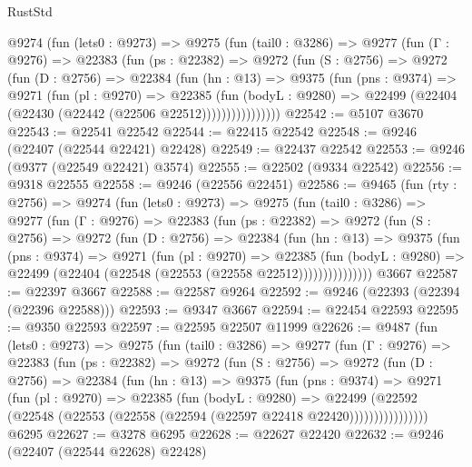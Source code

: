 \begin{lexlean}{RustStd}
\begin{coremodule}
{\begin{coremodule}
{{{{{{{{{{{{{{{{{{{{{{{{{{{{{{{{{      @9274
        (fun (lets0 : @9273) =>
        @9275
          (fun (tail0 : @3286) =>
          @9277
            (fun (Γ : @9276) =>
            @22383
              (fun (ps : @22382) =>
              @9272
                (fun (S : @2756) =>
                @9272
                  (fun (D : @2756) =>
                  @22384
                    (fun (hn : @13) =>
                    @9375
                      (fun (pns : @9374) =>
                      @9271
                        (fun (pl : @9270) =>
                        @22385
                          (fun (bodyL : @9280) =>
                          @22499 (@22404 (@22430 (@22442 (@22506 @22512))))))))))))))))
@22542 := @5107 @3670
@22543 := @22541 @22542
@22544 := @22415 @22542
@22548 := @9246 (@22407 (@22544 @22421) @22428)
@22549 := @22437 @22542
@22553 := @9246 (@9377 (@22549 @22421) @3574)
@22555 := @22502 (@9334 @22542)
@22556 := @9318 @22555
@22558 := @9246 (@22556 @22451)
@22586 := @9465
    (fun (rty : @2756) =>
    @9274
      (fun (lets0 : @9273) =>
      @9275
        (fun (tail0 : @3286) =>
        @9277
          (fun (Γ : @9276) =>
          @22383
            (fun (ps : @22382) =>
            @9272
              (fun (S : @2756) =>
              @9272
                (fun (D : @2756) =>
                @22384
                  (fun (hn : @13) =>
                  @9375
                    (fun (pns : @9374) =>
                    @9271
                      (fun (pl : @9270) =>
                      @22385
                        (fun (bodyL : @9280) =>
                        @22499 (@22404 (@22548 (@22553 (@22558 @22512)))))))))))))))
    @3667
@22587 := @22397 @3667
@22588 := @22587 @9264
@22592 := @9246 (@22393 (@22394 (@22396 @22588)))
@22593 := @9347 @3667
@22594 := @22454 @22593
@22595 := @9350 @22593
@22597 := @22595 @22507 @11999
@22626 := @9487
    (fun (lets0 : @9273) =>
    @9275
      (fun (tail0 : @3286) =>
      @9277
        (fun (Γ : @9276) =>
        @22383
          (fun (ps : @22382) =>
          @9272
            (fun (S : @2756) =>
            @9272
              (fun (D : @2756) =>
              @22384
                (fun (hn : @13) =>
                @9375
                  (fun (pns : @9374) =>
                  @9271
                    (fun (pl : @9270) =>
                    @22385
                      (fun (bodyL : @9280) =>
                      @22499
                        (@22592
                          (@22548 (@22553 (@22558 (@22594 (@22597 @22418 @22420))))))))))))))))
    @6295
@22627 := @3278 @6295
@22628 := @22627 @22420
@22632 := @9246 (@22407 (@22544 @22628) @22428)
}}}}}}}}}}}}}}}}}}}}}}}}}}}}}}}}}
\end{coremodule}}
\end{coremodule}
\end{lexlean}
